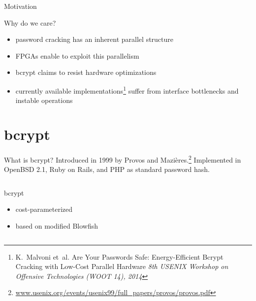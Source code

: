 \begin{frame}{Motivation}
	\begin{block}{Why do we care?}
		\begin{itemize}
			\item password cracking has an inherent parallel structure
			\item FPGAs enable to exploit this parallelism
		\end{itemize}
		\begin{itemize}
			\item bcrypt claims to resist hardware optimizations
			\item currently available implementations\footnote{K.~Malvoni et~al.
				Are Your Passwords Safe: Energy-Efficient Bcrypt Cracking with
				Low-Cost Parallel Hardware {\em 8th USENIX Workshop on Offensive
				Technologies (WOOT 14), 2014}}
				suffer from interface bottlenecks and instable operations
		\end{itemize}
	\end{block}
\end{frame}

\section{bcrypt}

\begin{frame}{What is bcrypt?}
	Introduced in 1999 by Provos and Mazi\`{e}res.\footnote{\tiny \url{www.usenix.org/events/usenix99/full_papers/provos/provos.pdf}}
	Implemented in OpenBSD 2.1, Ruby on Rails, and PHP as standard password hash.

	\begin{columns}[T]
		\begin{column}{.47\textwidth}
			\begin{block}{bcrypt}
				\begin{itemize}
					\item cost-parameterized
					\item based on modified Blowfish
				\end{itemize}
			\end{block}
		\end{column}
	\end{columns}
\end{frame}

